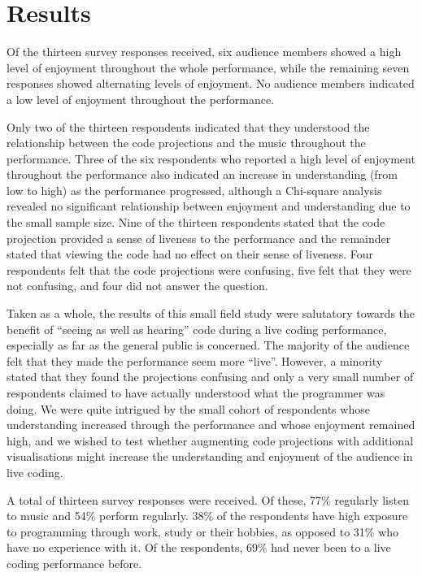 \section{Results}
\label{sec:fieldstudyresults}


Of the thirteen survey responses received, six audience members showed
a high level of enjoyment throughout the whole performance, while the
remaining seven responses showed alternating levels of enjoyment. No
audience members indicated a low level of enjoyment throughout the
performance.

Only two of the thirteen respondents indicated that they understood
the relationship between the code projections and the music throughout
the performance. Three of the six respondents who reported a high
level of enjoyment throughout the performance also indicated an
increase in understanding (from low to high) as the performance
progressed, although a Chi-square analysis revealed no significant
relationship between enjoyment and understanding due to the small
sample size. Nine of the thirteen respondents stated that the code
projection provided a sense of liveness to the performance and the
remainder stated that viewing the code had no effect on their sense of
liveness. Four respondents felt that the code projections were
confusing, five felt that they were not confusing, and four did not
answer the question.

Taken as a whole, the results of this small field study were
salutatory towards the benefit of ``seeing as well as hearing'' code
during a live coding performance, especially as far as the general
public is concerned. The majority of the audience felt that they made
the performance seem more ``live''. However, a minority stated that
they found the projections confusing and only a very small number of
respondents claimed to have actually understood what the programmer
was doing. We were quite intrigued by the small cohort of respondents
whose understanding increased through the performance and whose
enjoyment remained high, and we wished to test whether augmenting code
projections with additional visualisations might increase the
understanding and enjoyment of the audience in live coding.


A total of thirteen survey responses were received. Of these, 77\% regularly listen to music and 54\% perform regularly. 38\% of the respondents have high exposure to programming through work, study or their hobbies, as opposed to 31\% who have no experience with it. Of the respondents, 69\% had never been to a live coding performance before.


